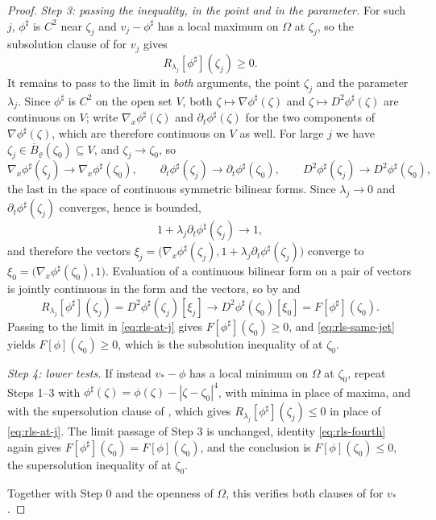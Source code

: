 \begin{proof}
\emph{Step 3: passing the inequality, in the point and in the parameter.}
For such $j$, $\phi^\sharp$ is $C^2$ near $\zeta_j$ and $v_j-\phi^\sharp$ has a
local maximum on $\Omega$ at $\zeta_j$, so the subsolution clause of
 for $v_j$ gives
\begin{equation}\label{eq:rls-at-j}
  R_{\lambda_j}[\phi^\sharp](\zeta_j)\ge0 .
\end{equation}
It remains to pass to the limit in \emph{both} arguments, the point $\zeta_j$ and
the parameter $\lambda_j$. Since $\phi^\sharp$ is $C^2$ on the open set $V$, both
$\zeta\mapsto\nabla\phi^\sharp(\zeta)$ and
$\zeta\mapsto D^2\phi^\sharp(\zeta)$ are continuous on $V$; write
$\nabla_x\phi^\sharp(\zeta)$ and $\partial_t\phi^\sharp(\zeta)$ for the two
components of $\nabla\phi^\sharp(\zeta)$, which are therefore continuous on $V$
as well. For large $j$ we have $\zeta_j\in\overline B_\varrho(\zeta_0)\subseteq V$,
and $\zeta_j\to\zeta_0$, so
\[
  \nabla_x\phi^\sharp(\zeta_j)\to\nabla_x\phi^\sharp(\zeta_0),\qquad
  \partial_t\phi^\sharp(\zeta_j)\to\partial_t\phi^\sharp(\zeta_0),\qquad
  D^2\phi^\sharp(\zeta_j)\to D^2\phi^\sharp(\zeta_0),
\]
the last in the space of continuous symmetric bilinear forms. Since
$\lambda_j\to0$ and $\partial_t\phi^\sharp(\zeta_j)$ converges, hence is bounded,
\[
  1+\lambda_j\partial_t\phi^\sharp(\zeta_j)\longrightarrow1,
\]
and therefore the vectors
$\xi_j=\bigl(\nabla_x\phi^\sharp(\zeta_j),1+\lambda_j
  \partial_t\phi^\sharp(\zeta_j)\bigr)$
converge to $\xi_0=\bigl(\nabla_x\phi^\sharp(\zeta_0),1\bigr)$. Evaluation of a
continuous bilinear form on a pair of vectors is jointly continuous in the form
and the vectors, so by  and 
\[
  R_{\lambda_j}[\phi^\sharp](\zeta_j)
   =D^2\phi^\sharp(\zeta_j)[\xi_j]
   \longrightarrow D^2\phi^\sharp(\zeta_0)[\xi_0]
   =F[\phi^\sharp](\zeta_0).
\]
Passing to the limit in \eqref{eq:rls-at-j} gives
$F[\phi^\sharp](\zeta_0)\ge0$, and \eqref{eq:rls-same-jet} yields
$F[\phi](\zeta_0)\ge0$, which is the subsolution inequality of
 at $\zeta_0$.

\emph{Step 4: lower tests.}
If instead $v_*-\phi$ has a local minimum on $\Omega$ at $\zeta_0$, repeat
Steps 1--3 with $\phi^\sharp(\zeta)=\phi(\zeta)-|\zeta-\zeta_0|^4$, with minima
in place of maxima, and with the supersolution clause of
, which gives
$R_{\lambda_j}[\phi^\sharp](\zeta_j)\le0$ in place of \eqref{eq:rls-at-j}. The
limit passage of Step 3 is unchanged, identity \eqref{eq:rls-fourth} again gives
$F[\phi^\sharp](\zeta_0)=F[\phi](\zeta_0)$, and the conclusion is
$F[\phi](\zeta_0)\le0$, the supersolution inequality of
 at $\zeta_0$.

Together with Step 0 and the openness of $\Omega$, this verifies both clauses of
 for $v_*$.
\end{proof}

